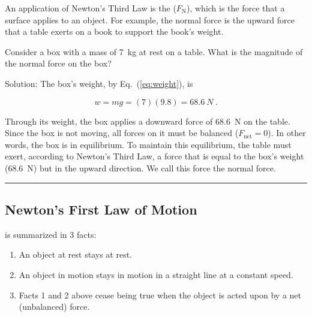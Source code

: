\documentclass[]{article}
\begin{document}
An application of Newton's Third Law is the  ($F_{\text{N}}$), which is the force that a surface applies to an object. For example, the normal force is the upward force that a table exerts on a book to support the book's weight.

\begin{example} \label{A8Qdlc}
Consider a box with a mass of \SI{7}{kg} at rest on a table. What is the magnitude of the normal force on the box? 
\end{example}

Solution: The box's weight, by Eq.~(\ref{eq:weight}), is

\begin{equation*}
    w = m g = (7)(9.8) = \SI{68.6}{N}\ .
\end{equation*}

Through its weight, the box applies a downward force of \SI{68.6}{N} on the table. Since the box is not moving, all forces on it must be balanced ($F_{\text{net}} = 0$). In other words, the box is in equilibrium. To maintain this equilibrium, the table must exert, according to Newton's Third Law, a force that is equal to the box's weight (\SI{68.6}{N}) but in the upward direction. We call this force the normal force.

\begin{center}
\end{center}

\hrule

\subsection{Newton's First Law of Motion} \label{XeoZti}

\begin{mdframed}[backgroundcolor=black!10]
 is summarized in 3 facts:
\vspace{-1ex}

\begin{enumerate}
\setlength\itemsep{0ex}
    \item An object at rest stays at rest.
    \item An object in motion stays in motion in a straight line at a constant speed.
    \item Facts 1 and 2 above cease being true when the object is acted upon by a net (unbalanced) force.
\end{enumerate}
\end{mdframed}
\end{document}
